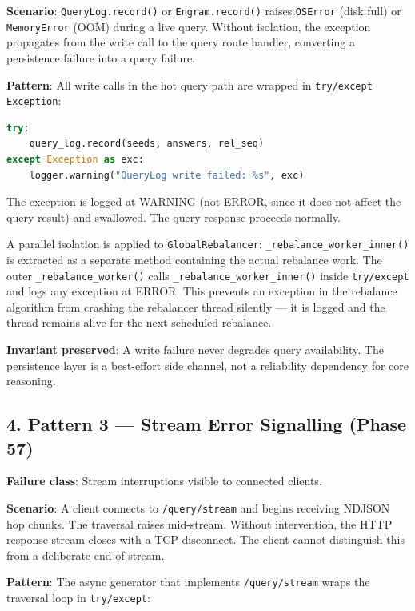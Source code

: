 \textbf{Scenario}: \texttt{QueryLog.record()} or \texttt{Engram.record()} raises \texttt{OSError} (disk full) or \texttt{MemoryError} (OOM) during a live query. Without isolation, the exception propagates from the write call to the query route handler, converting a persistence failure into a query failure.

\textbf{Pattern}: All write calls in the hot query path are wrapped in \texttt{try/except Exception}:

\begin{lstlisting}[language=Python]
try:
    query_log.record(seeds, answers, rel_seq)
except Exception as exc:
    logger.warning("QueryLog write failed: %s", exc)
\end{lstlisting}

The exception is logged at WARNING (not ERROR, since it does not affect the query result) and swallowed. The query response proceeds normally.

A parallel isolation is applied to \texttt{GlobalRebalancer}: \texttt{\_rebalance\_worker\_inner()} is extracted as a separate method containing the actual rebalance work. The outer \texttt{\_rebalance\_worker()} calls \texttt{\_rebalance\_worker\_inner()} inside \texttt{try/except} and logs any exception at ERROR. This prevents an exception in the rebalance algorithm from crashing the rebalancer thread silently --- it is logged and the thread remains alive for the next scheduled rebalance.

\textbf{Invariant preserved}: A write failure never degrades query availability. The persistence layer is a best-effort side channel, not a reliability dependency for core reasoning.

\subsection*{4. Pattern 3 --- Stream Error Signalling (Phase 57)}

\textbf{Failure class}: Stream interruptions visible to connected clients.

\textbf{Scenario}: A client connects to \texttt{/query/stream} and begins receiving NDJSON hop chunks. The traversal raises mid-stream. Without intervention, the HTTP response stream closes with a TCP disconnect. The client cannot distinguish this from a deliberate end-of-stream.

\textbf{Pattern}: The async generator that implements \texttt{/query/stream} wraps the traversal loop in \texttt{try/except}:

